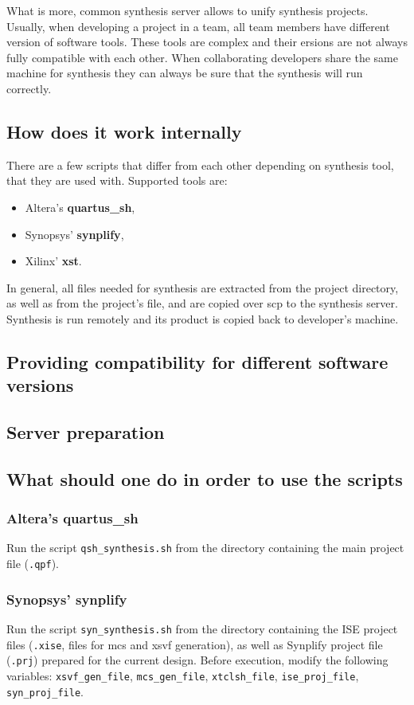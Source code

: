 \documentclass[a4paper,10pt]{article}
\begin{document}
What is more, common synthesis server allows to unify synthesis projects. Usually, when developing a project in a team, all team members have different version of software tools. These tools are complex and their ersions are not always fully compatible with each other. When collaborating developers share the same machine for synthesis they can always be sure that the synthesis will run correctly.
\subsection{How does it work internally}
There are a few scripts that differ from each other depending on synthesis tool, that they are used with. Supported tools are:
\begin{itemize}
\item Altera's \textbf{quartus\_sh},
\item Synopsys' \textbf{synplify},
\item Xilinx' \textbf{xst}.
\end{itemize}
In general, all files needed for synthesis are extracted from the project directory, as well as from the project's file, and are copied over scp to the synthesis server. Synthesis is run remotely and its product is copied back to developer's machine.
\subsection{Providing compatibility for different software versions}
\subsection{Server preparation}
\subsection{What should one do in order to use the scripts}
\subsubsection{Altera's quartus\_sh}
Run the script \verb!qsh_synthesis.sh! from the directory containing the main project file (\verb!.qpf!).  
\subsubsection{Synopsys' synplify}
Run the script \verb!syn_synthesis.sh! from the directory containing the ISE project files (\verb!.xise!, files for mcs and xsvf generation), as well as Synplify project file (\verb!.prj!) prepared for the current design. Before execution, modify the following variables: \verb!xsvf_gen_file!, \verb!mcs_gen_file!, \verb!xtclsh_file!, \verb!ise_proj_file!, \verb!syn_proj_file!.
\end{document}
